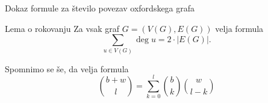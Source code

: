 \documentclass[dvipsnames]{beamer}
\newcommand{\graf}[1][G]{\ensuremath{#1 = (V(#1), E(#1))}}
\DeclareMathOperator {\stopnja} {deg}
\begin{document}
\begin{frame}{Dokaz formule za število povezav oxfordskega grafa}
    \begin{block}{Lema o rokovanju}
        Za vsak graf $\graf$ velja formula
        \begin{equation*}
        \sum_{u \in V(G)}\!\! \stopnja u = 2 \cdot |E(G)|.
        \end{equation*}
    \end{block}
    
    Spomnimo se še, da velja formula 
    \[ {b+w \choose l} = \sum_{k=0}^{l}{b \choose k}{w \choose l-k} \]
\end{frame}

\end{document}
